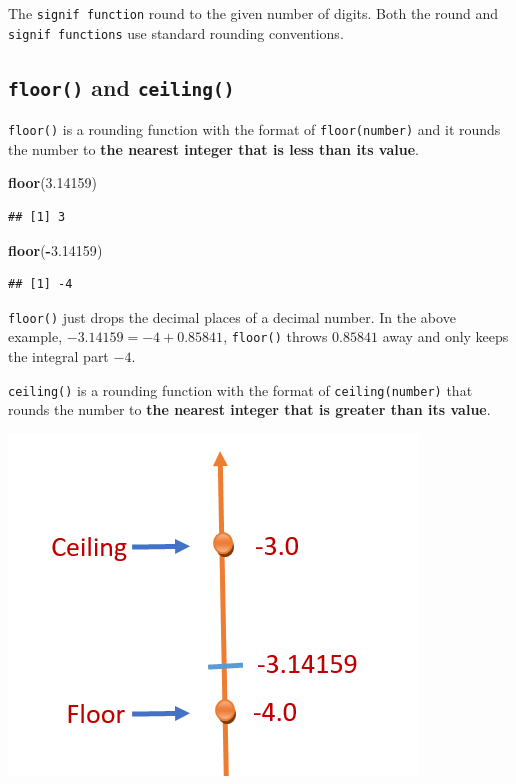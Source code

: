 \documentclass[
]{book}
\newenvironment{Shaded}{\begin{snugshade}}{\end{snugshade}}
\newcommand{\FloatTok}[1]{\textcolor[rgb]{0.00,0.00,0.81}{#1}}
\newcommand{\FunctionTok}[1]{\textcolor[rgb]{0.13,0.29,0.53}{\textbf{#1}}}
\newcommand{\NormalTok}[1]{#1}
\newcommand{\SpecialCharTok}[1]{\textcolor[rgb]{0.81,0.36,0.00}{\textbf{#1}}}
\begin{document}
The \texttt{signif\ function} round to the given number of digits. Both the round and \texttt{signif\ functions} use standard rounding conventions.

\hypertarget{floor-and-ceiling}{%
\subsection{\texorpdfstring{\texttt{floor()} and \texttt{ceiling()}}{floor() and ceiling()}}\label{floor-and-ceiling}}

\texttt{floor()} is a rounding function with the format of \texttt{floor(number)} and it rounds the number to \textbf{the nearest integer that is less than its value}.

\begin{Shaded}
\begin{Highlighting}[]
\FunctionTok{floor}\NormalTok{(}\FloatTok{3.14159}\NormalTok{)}
\end{Highlighting}
\end{Shaded}

\begin{verbatim}
## [1] 3
\end{verbatim}

\begin{Shaded}
\begin{Highlighting}[]
\FunctionTok{floor}\NormalTok{(}\SpecialCharTok{{-}}\FloatTok{3.14159}\NormalTok{)}
\end{Highlighting}
\end{Shaded}

\begin{verbatim}
## [1] -4
\end{verbatim}

\texttt{floor()} just drops the decimal places of a decimal number. In the above example, \(-3.14159 = -4 + 0.85841\), \texttt{floor()} throws \(0.85841\) away and only keeps the integral part \(-4\).

\texttt{ceiling()} is a rounding function with the format of \texttt{ceiling(number)} that rounds the number to \textbf{the nearest integer that is greater than its value}.

\begin{center}\includegraphics[width=0.35\linewidth]{img02/w02-floorCeilingFun} \end{center}
\end{document}
